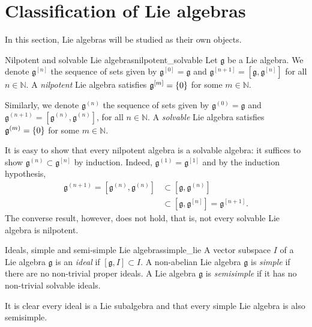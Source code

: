 \section{Classification of Lie algebras}

In this section, Lie algebras will be studied as their own objects.

\begin{definition}{Nilpotent and solvable Lie algebras}{nilpotent_solvable}
    Let \(\mathfrak{g}\) be a Lie algebra. We denote \(\mathfrak{g}^{[n]}\) the sequence of sets given by \(\mathfrak{g}^{[0]} = \mathfrak{g}\) and \(\mathfrak{g}^{[n+1]} = [\mathfrak{g}, \mathfrak{g}^{[n]}]\) for all \(n \in \mathbb{N}\). A \emph{nilpotent} Lie algebra satisfies \(\mathfrak{g}^{[m]} = \{0\}\) for some \(m \in \mathbb{N}.\)

    Similarly, we denote \(\mathfrak{g}^{(n)}\) the sequence of sets given by \(\mathfrak{g}^{(0)} = \mathfrak{g}\) and \(\mathfrak{g}^{(n+1)} = [\mathfrak{g}^{(n)}, \mathfrak{g}^{(n)}]\), for all \(n \in \mathbb{N}\). A \emph{solvable} Lie algebra satisfies \(\mathfrak{g}^{(m)} = \{0\}\) for some \(m \in \mathbb{N}\).
\end{definition}
\begin{remark}
    It is easy to show that every nilpotent algebra is a solvable algebra: it suffices to show \(\mathfrak{g}^{(n)} \subset \mathfrak{g}^{[n]}\) by induction. Indeed, \(\mathfrak{g}^{(1)} = \mathfrak{g}^{[1]}\) and by the induction hypothesis,
    \begin{align*}
        \mathfrak{g}^{(n+1)} = [\mathfrak{g}^{(n)}, \mathfrak{g}^{(n)}] &\subset [\mathfrak{g}, \mathfrak{g}^{(n)}]\\
                                                                        &\subset [\mathfrak{g}, \mathfrak{g}^{[n]}] = \mathfrak{g}^{[n+1]}.
    \end{align*}
    The converse result, however, does not hold, that is, not every solvable Lie algebra is nilpotent.
\end{remark}

\begin{definition}{Ideals, simple and semi-simple Lie algebras}{simple_lie}
    A vector subspace \(I\) of a Lie algebra \(\mathfrak{g}\) is an \emph{ideal} if \([\mathfrak{g}, I] \subset I\). A non-abelian Lie algebra \(\mathfrak{g}\) is \emph{simple} if there are no non-trivial proper ideals. A Lie algebra \(\mathfrak{g}\) is \emph{semisimple} if it has no non-trivial solvable ideals.
\end{definition}
\begin{remark}
    It is clear every ideal is a Lie subalgebra and that every simple Lie algebra is also semisimple.
\end{remark}

